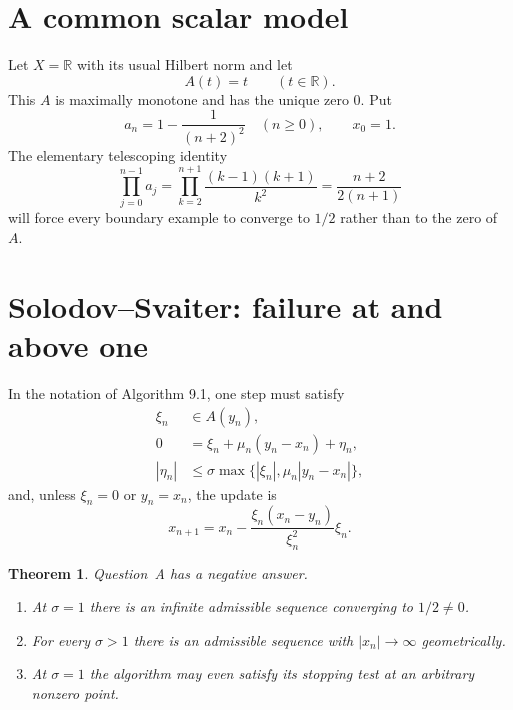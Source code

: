 \documentclass[11pt]{article}
\newtheorem{theorem}{Theorem}
\newcommand{\R}{\mathbb R}
\begin{document}
\section{A common scalar model}

Let $X=\R$ with its usual Hilbert norm and let
\[
 A(t)=t\qquad(t\in\R).
\]
This $A$ is maximally monotone and has the unique zero $0$.  Put
\begin{equation}\label{an}
 a_n=1-\frac1{(n+2)^2}\quad(n\ge0),
 \qquad x_0=1.
\end{equation}
The elementary telescoping identity
\begin{equation}\label{product}
 \prod_{j=0}^{n-1}a_j
 =\prod_{k=2}^{n+1}\frac{(k-1)(k+1)}{k^2}
 =\frac{n+2}{2(n+1)}
\end{equation}
will force every boundary example to converge to $1/2$ rather than to the
zero of $A$.

\section{Solodov--Svaiter: failure at and above one}

In the notation of Algorithm 9.1, one step must satisfy
\begin{align}
 \xi_n&\in A(y_n),\label{ss1}\\
 0&=\xi_n+\mu_n(y_n-x_n)+\eta_n,\label{ss2}\\
 |\eta_n|&\le \sigma\max\{|\xi_n|,\mu_n|y_n-x_n|\},\label{ss3}
\end{align}
and, unless $\xi_n=0$ or $y_n=x_n$, the update is
\begin{equation}\label{ssupdate}
 x_{n+1}=x_n-\frac{\xi_n(x_n-y_n)}{\xi_n^2}\xi_n.
\end{equation}

\begin{theorem}\label{ss-theorem}
Question~A has a negative answer.
\begin{enumerate}
\item At $\sigma=1$ there is an infinite admissible sequence converging to
$1/2\ne0$.
\item For every $\sigma>1$ there is an admissible sequence with
$|x_n|\to\infty$ geometrically.
\item At $\sigma=1$ the algorithm may even satisfy its stopping test at an
arbitrary nonzero point.
\end{enumerate}
\end{theorem}
\end{document}
